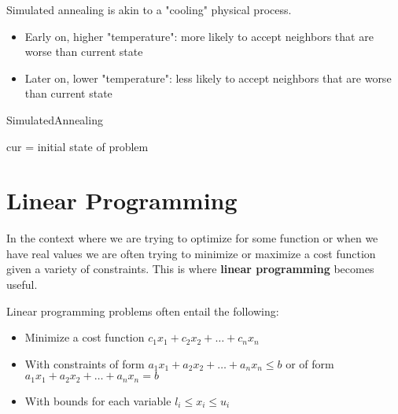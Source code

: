 \begin{definition}
	Simulated annealing is akin to a "cooling" physical process.
	\begin{itemize}
		\item Early on, higher "temperature": more likely to accept neighbors that are worse than current state
		\item Later on, lower "temperature": less likely to accept neighbors that are worse than current state
	\end{itemize}
\end{definition}

\begin{algorithm}[H]
	\DontPrintSemicolon
	\caption{SimulatedAnnealing}
	cur = initial state of problem \\
\end{algorithm}

\section{Linear Programming}
In the context where we are trying to optimize for some function or when we have real values we are often trying to minimize or maximize a cost function given a variety of constraints. This is where \textbf{linear programming} becomes useful.

\begin{definition}
	Linear programming problems often entail the following:
	\begin{itemize}
		\item Minimize a cost function \(c_1 x_1 + c_2 x_2 + \ldots + c_n x_n\)
		\item With constraints of form \(a_1 x_1 + a_2 x_2 + \ldots + a_n x_n \leq b\) or of form \(a_1 x_1 + a_2 x_2 + \ldots + a_n x_n = b\)
		\item With bounds for each variable \(l_i \leq x_i \leq u_i\) 
	\end{itemize}
\end{definition}